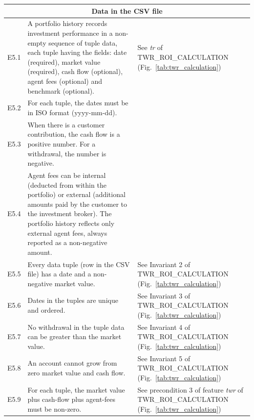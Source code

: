 \documentclass[runningheads,12pt]{article}
\begin{document}
{%
\centering
\begin{longtable}{|l|p{9cm}|p{5cm}|}

\hline
\multicolumn{3}{|c|}{\textbf{Data in the CSV file}} \\

\hline
E5.1 & A portfolio history records investment performance in a non-empty sequence of tuple data, each tuple having the fields: date (required), market value (required), cash flow (optional), agent fees (optional) and benchmark (optional). & See \textit{tr} of TWR\_ROI\_CALCULATION (Fig.~\ref{tab:twr_calculation})\\

\hline
E5.2 &  For each tuple, the dates must be in ISO format (yyyy-mm-dd). & \\

\hline
E5.3 & When there is a customer contribution, the cash flow is a positive number. For a withdrawal, the number is negative. & \\

\hline
E5.4 & Agent fees can be internal (deducted from within the portfolio) or external (additional amounts paid by the customer to the investment broker). The portfolio history reflects only external agent fees, always reported as a non-negative amount. & \\

\hline
E5.5 & Every data tuple (row in the CSV file) has a date and a non-negative market value. & See Invariant 2 of TWR\_ROI\_CALCULATION (Fig.~\ref{tab:twr_calculation})\\

\hline
E5.6 &  Dates in the tuples are unique and ordered. & See Invariant 3 of TWR\_ROI\_CALCULATION (Fig.~\ref{tab:twr_calculation})\\

\hline
E5.7 & No withdrawal in the tuple data can be greater than the market value. & See Invariant 4 of TWR\_ROI\_CALCULATION (Fig.~\ref{tab:twr_calculation})\\

\hline
E5.8 & An account cannot grow from zero market value and cash flow. & See Invariant 5 of TWR\_ROI\_CALCULATION (Fig.~\ref{tab:twr_calculation})\\

\hline
E5.9 &  For each tuple, the market value plus cash-flow plus agent-fees must be non-zero. & See precondition 3 of feature \textit{twr} of TWR\_ROI\_CALCULATION (Fig.~\ref{tab:twr_calculation})\\

\hline
\end{longtable}
}
\end{document}
